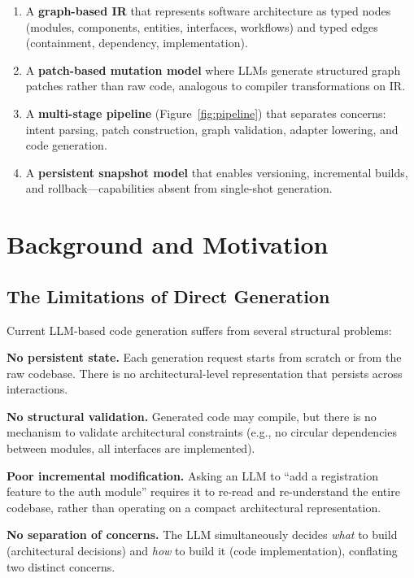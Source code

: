 \documentclass[11pt,a4paper]{article}
\begin{document}
\begin{enumerate}
    \item A \textbf{graph-based IR} that represents software architecture as typed nodes (modules, components, entities, interfaces, workflows) and typed edges (containment, dependency, implementation).
    \item A \textbf{patch-based mutation model} where LLMs generate structured graph patches rather than raw code, analogous to compiler transformations on IR.
    \item A \textbf{multi-stage pipeline} (Figure~\ref{fig:pipeline}) that separates concerns: intent parsing, patch construction, graph validation, adapter lowering, and code generation.
    \item A \textbf{persistent snapshot model} that enables versioning, incremental builds, and rollback---capabilities absent from single-shot generation.
\end{enumerate}

\section{Background and Motivation}

\subsection{The Limitations of Direct Generation}

Current LLM-based code generation suffers from several structural problems:

\textbf{No persistent state.} Each generation request starts from scratch or from the raw codebase. There is no architectural-level representation that persists across interactions.

\textbf{No structural validation.} Generated code may compile, but there is no mechanism to validate architectural constraints (e.g., no circular dependencies between modules, all interfaces are implemented).

\textbf{Poor incremental modification.} Asking an LLM to ``add a registration feature to the auth module'' requires it to re-read and re-understand the entire codebase, rather than operating on a compact architectural representation.

\textbf{No separation of concerns.} The LLM simultaneously decides \emph{what} to build (architectural decisions) and \emph{how} to build it (code implementation), conflating two distinct concerns.
\end{document}
